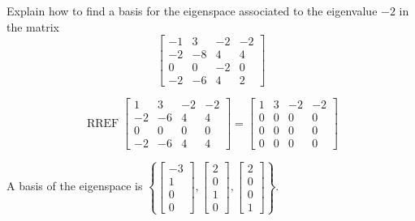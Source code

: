 
\begin{exerciseStatement}


Explain how to find a basis for the eigenspace associated to the eigenvalue \( -2 \) in the matrix \[ \left[\begin{array}{cccc}
-1 & 3 & -2 & -2 \\
-2 & -8 & 4 & 4 \\
0 & 0 & -2 & 0 \\
-2 & -6 & 4 & 2
\end{array}\right] \]


\end{exerciseStatement}
    
\begin{exerciseAnswer} 


\[\operatorname{RREF} \left[\begin{array}{cccc}
1 & 3 & -2 & -2 \\
-2 & -6 & 4 & 4 \\
0 & 0 & 0 & 0 \\
-2 & -6 & 4 & 4
\end{array}\right] = \left[\begin{array}{cccc}
1 & 3 & -2 & -2 \\
0 & 0 & 0 & 0 \\
0 & 0 & 0 & 0 \\
0 & 0 & 0 & 0
\end{array}\right] \]



A basis of the eigenspace is \( \left\{ \left[\begin{array}{c}
-3 \\
1 \\
0 \\
0
\end{array}\right] , \left[\begin{array}{c}
2 \\
0 \\
1 \\
0
\end{array}\right] , \left[\begin{array}{c}
2 \\
0 \\
0 \\
1
\end{array}\right] \right\} \).


\end{exerciseAnswer}
    
